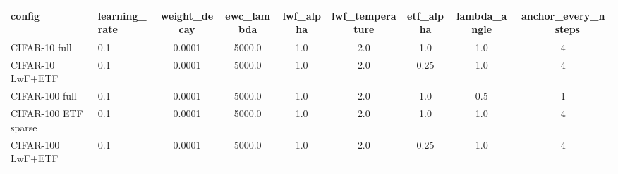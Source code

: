 \begin{tabular}{llccccccc}
\hline
config & learning\_rate & weight\_decay & ewc\_lambda & lwf\_alpha & lwf\_temperature & etf\_alpha & lambda\_angle & anchor\_every\_n\_steps \\
\hline
CIFAR-10 full & 0.1 & 0.0001 & 5000.0 & 1.0 & 2.0 & 1.0 & 1.0 & 4 \\
CIFAR-10 LwF+ETF & 0.1 & 0.0001 & 5000.0 & 1.0 & 2.0 & 0.25 & 1.0 & 4 \\
CIFAR-100 full & 0.1 & 0.0001 & 5000.0 & 1.0 & 2.0 & 1.0 & 0.5 & 1 \\
CIFAR-100 ETF sparse & 0.1 & 0.0001 & 5000.0 & 1.0 & 2.0 & 1.0 & 1.0 & 4 \\
CIFAR-100 LwF+ETF & 0.1 & 0.0001 & 5000.0 & 1.0 & 2.0 & 0.25 & 1.0 & 4 \\
\hline
\end{tabular}
